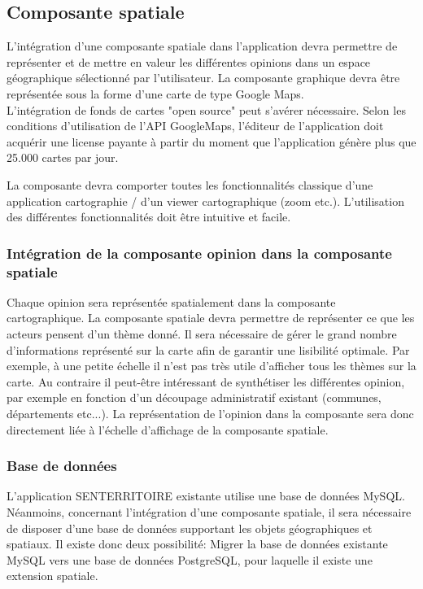 \subsection{Composante spatiale}

L'intégration d'une composante spatiale dans l'application devra permettre de représenter et de mettre en valeur les différentes opinions dans un espace géographique sélectionné par l'utilisateur. La composante graphique devra être représentée sous la forme d'une carte de type Google Maps. \\ 

L'intégration de fonds de cartes "open source" peut s'avérer nécessaire. Selon les conditions d'utilisation de l'API GoogleMaps, l'éditeur de l'application doit acquérir une license payante à partir du moment que l'application génère plus que 25.000 cartes par jour.

La composante devra comporter toutes les fonctionnalités classique d'une application cartographie / d'un viewer cartographique (zoom etc.). L'utilisation des différentes fonctionnalités doit être intuitive et facile.


\subsubsection{Intégration de la composante opinion dans la composante spatiale}

Chaque opinion sera représentée spatialement dans la composante cartographique. La composante spatiale devra permettre de représenter ce que les acteurs pensent d'un thème donné. Il sera nécessaire de gérer le grand nombre d'informations représenté sur la carte afin de garantir une lisibilité optimale. Par exemple, à une petite échelle il n'est pas très utile d'afficher tous les thèmes sur la carte. Au contraire il peut-être intéressant de synthétiser les différentes opinion, par exemple en fonction d'un découpage administratif existant (communes, départements etc...). La représentation de l'opinion dans la composante sera donc directement liée à l'échelle d'affichage de la composante spatiale.

\subsubsection{Base de données}

L'application SENTERRITOIRE existante utilise une base de données MySQL. Néanmoins, concernant l'intégration d'une composante spatiale, il sera nécessaire de disposer d'une base de données supportant les objets géographiques et spatiaux. Il existe donc deux possibilité: Migrer la base de données existante MySQL vers une base de données PostgreSQL, pour laquelle il existe une extension spatiale.

